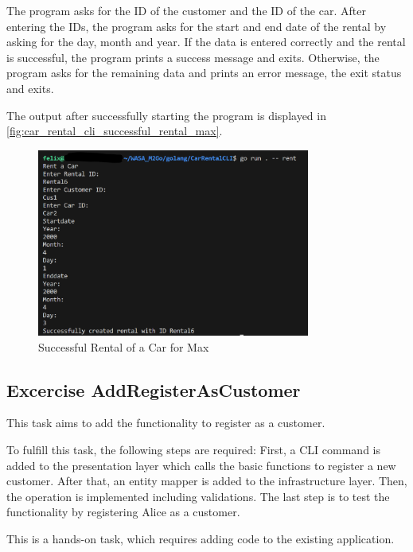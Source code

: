 The program asks for the ID of the customer and the ID of the car.
After entering the IDs, the program asks for the start and end date of the rental by asking for the day, month and year.
If the data is entered correctly and the rental is successful, the program prints a success message and exits.
Otherwise, the program asks for the remaining data and prints an error message, the exit status and exits.

The output after successfully starting the program is displayed in \autoref{fig:car_rental_cli_successful_rental_max}.

\begin{figure}
      \centering
      \includegraphics[width=0.8\textwidth]{figures/goLang/carRental/carRentalCLI/carRentalCli_SuccessfulRentalMax.png}
      \caption{Successful Rental of a Car for Max}
      \label{fig:car_rental_cli_successful_rental_max}
\end{figure}

\subsection{Excercise AddRegisterAsCustomer}
\label{sec:exercise_add_register_as_customer}
This task aims to add the functionality to register as a customer.

To fulfill this task, the following steps are required:
First, a CLI command is added to the presentation layer which calls the basic functions to register a new customer.
After that, an entity mapper is added to the infrastructure layer.
Then, the operation is implemented including validations.
The last step is to test the functionality by registering Alice as a customer.

This is a hands-on task, which requires adding code to the existing application.

